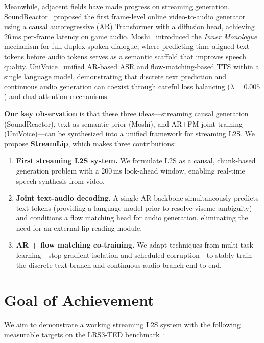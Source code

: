 \documentclass{article}
\begin{document}
Meanwhile, adjacent fields have made progress on streaming generation. SoundReactor~\cite{soundreactor} proposed the first frame-level online video-to-audio generator using a causal autoregressive (AR) Transformer with a diffusion head, achieving 26\,ms per-frame latency on game audio. Moshi~\cite{moshi} introduced the \textit{Inner Monologue} mechanism for full-duplex spoken dialogue, where predicting time-aligned text tokens before audio tokens serves as a semantic scaffold that improves speech quality. UniVoice~\cite{univoice} unified AR-based ASR and flow-matching-based TTS within a single language model, demonstrating that discrete text prediction and continuous audio generation can coexist through careful loss balancing ($\lambda{=}0.005$) and dual attention mechanisms.

\textbf{Our key observation} is that these three ideas---streaming causal generation (SoundReactor), text-as-semantic-prior (Moshi), and AR+FM joint training (UniVoice)---can be synthesized into a unified framework for streaming L2S.  We propose \textbf{StreamLip}, which makes three contributions:

\begin{enumerate}
    \item \textbf{First streaming L2S system.} We formulate L2S as a causal, chunk-based generation problem with a 200\,ms look-ahead window, enabling real-time speech synthesis from video.
    \item \textbf{Joint text-audio decoding.} A single AR backbone simultaneously predicts text tokens (providing a language model prior to resolve viseme ambiguity) and conditions a flow matching head for audio generation, eliminating the need for an external lip-reading module.
    \item \textbf{AR + flow matching co-training.} We adapt techniques from multi-task learning---stop-gradient isolation and scheduled corruption---to stably train the discrete text branch and continuous audio branch end-to-end.
\end{enumerate}

\section{Goal of Achievement}

We aim to demonstrate a working streaming L2S system with the following measurable targets on the LRS3-TED benchmark~\cite{lrs3}:
\end{document}
